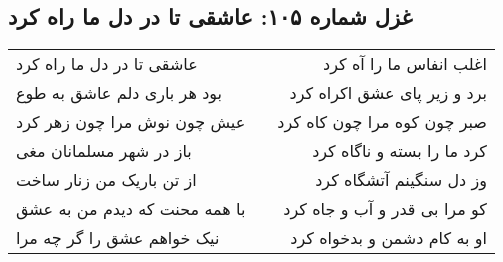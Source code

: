 \begin{center}
\section*{غزل شماره ۱۰۵: عاشقی تا در دل ما راه کرد}
\label{sec:105}
\begin{longtable}{l p{0.5cm} r}
عاشقی تا در دل ما راه کرد
&&
اغلب انفاس ما را آه کرد
\\
بود هر باری دلم عاشق به طوع
&&
برد و زیر پای عشق اکراه کرد
\\
عیش چون نوش مرا چون زهر کرد
&&
صبر چون کوه مرا چون کاه کرد
\\
باز در شهر مسلمانان مغی
&&
کرد ما را بسته و ناگاه کرد
\\
از تن باریک من زنار ساخت
&&
وز دل سنگینم آتشگاه کرد
\\
با همه محنت که دیدم من به عشق
&&
کو مرا بی قدر و آب و جاه کرد
\\
نیک خواهم عشق را گر چه مرا
&&
او به کام دشمن و بدخواه کرد
\\
\end{longtable}
\end{center}
